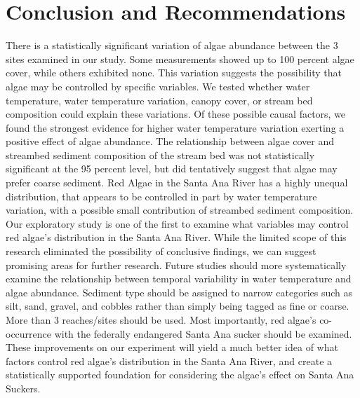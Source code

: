 \documentclass{article}\usepackage[]{graphicx}\usepackage[]{color}
\begin{document}
\section{Conclusion and Recommendations}
There is a statistically significant variation of algae abundance between the 3 sites examined in our study. Some measurements showed up to 100 percent algae cover, while others exhibited none. This variation suggests the possibility that algae may be controlled by specific variables. We tested whether water temperature, water temperature variation, canopy cover, or stream bed composition could explain these variations. Of these possible causal factors, we found the strongest evidence for higher water temperature variation exerting a positive effect of algae abundance. The relationship between algae cover and streambed sediment composition of the stream bed was not statistically significant at the 95 percent level, but did tentatively suggest that algae may prefer coarse sediment. Red Algae in the Santa Ana River has a highly unequal distribution, that appears to be controlled in part by water temperature variation, with a possible small contribution of streambed sediment composition. 
Our exploratory study is one of the first to examine what variables may control red algae's distribution in the Santa Ana River. While the limited scope of this research eliminated the possibility of conclusive findings, we can suggest promising areas for further research. Future studies should more systematically examine the relationship between temporal variability in water temperature and algae abundance. Sediment type should be assigned to narrow categories such as silt, sand, gravel, and cobbles rather than simply being tagged as fine or coarse. More than 3 reaches/sites should be used. Most importantly, red algae’s co-occurrence with the federally endangered Santa Ana sucker should be examined. These improvements on our experiment will yield a much better idea of what factors control red algae’s distribution in the Santa Ana River, and create a statistically supported foundation for considering the algae’s effect on Santa Ana Suckers. 
\end{document}
